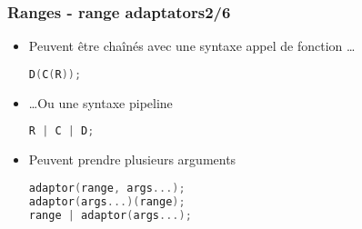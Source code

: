 \documentclass[C++.tex]{subfiles}
\begin{document}
\begin{frame}[fragile]
	\frametitle{Ranges - range adaptators\titlehfill{}2/6}
	\begin{itemize}
		\item Peuvent être chaînés avec une syntaxe \og appel de fonction\fg{} \ldots

		\begin{lstlisting}[language=C++]
D(C(R));\end{lstlisting}
		
		\item \ldots Ou une syntaxe \og pipeline\fg{}

		\begin{lstlisting}[language=C++]
R | C | D;\end{lstlisting}

		\item Peuvent prendre plusieurs arguments


		\begin{lstlisting}[language=C++]
adaptor(range, args...);
adaptor(args...)(range);
range | adaptor(args...);\end{lstlisting}

	\end{itemize}
\end{frame}
\end{document}
